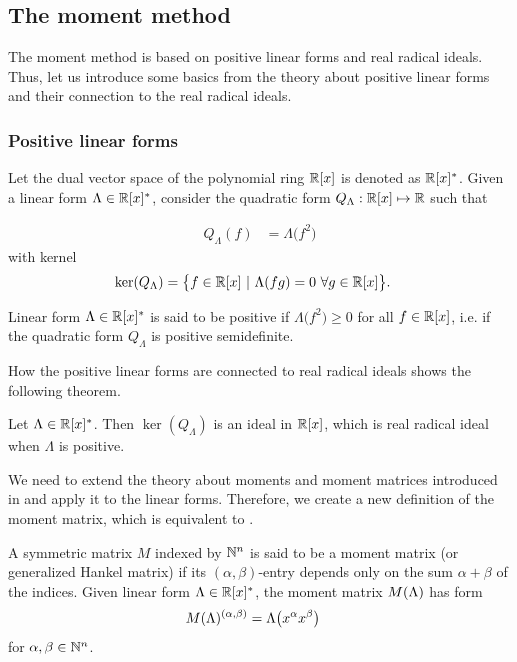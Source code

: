 \subsection{The moment method}
The moment method is based on positive linear forms and real radical ideals.
Thus, let us introduce some basics from the theory about positive linear forms and their connection to the real radical ideals.

\subsubsection{Positive linear forms}
Let the dual vector space of the polynomial ring $\mathbb{R}[x]$ is denoted as $\mathbb{R}[x]^*$.
Given a linear form $\Lambda\in\mathbb{R}[x]^*$, consider the quadratic form $Q_\Lambda : \mathbb{R}[x]\mapsto\mathbb{R}$ such that

\begin{align}
  Q_\Lambda(f) &= \Lambda\big(f^2\big)
\end{align}
with kernel
\begin{align}
  \operatorname{ker}(Q_\Lambda) &= \big\{f\in\mathbb{R}[x]\ |\ \Lambda(fg)=0\ \forall g\in\mathbb{R}[x]\big\}.
\end{align}

\begin{definition}[Positivity]
  Linear form $\Lambda\in\mathbb{R}[x]^*$ is said to be positive if $\Lambda\big(f^2\big) \geq 0$ for all $f\in\mathbb{R}[x]$, i.e. if the quadratic form $Q_\Lambda$ is positive semidefinite.
\end{definition}

How the positive linear forms are connected to real radical ideals shows the following theorem.

\begin{theorem}
  Let $\Lambda\in\mathbb{R}[x]^*$. Then $\ker(Q_\Lambda)$ is an ideal in $\mathbb{R}[x]$, which is real radical ideal when $\Lambda$ is positive.
\end{theorem}

We need to extend the theory about moments and moment matrices introduced in  and apply it to the linear forms.
Therefore, we create a new definition of the moment matrix, which is equivalent to .

\begin{definition}
  A symmetric matrix $M$ indexed by $\mathbb{N}^n$ is said to be a moment matrix (or generalized Hankel matrix) if its $(\alpha, \beta)$-entry depends only on the sum $\alpha + \beta$ of the indices.
  Given linear form $\Lambda\in\mathbb{R}[x]^*$, the moment matrix $M(\Lambda)$ has form
  \begin{align}
    M(\Lambda)^{(\alpha, \beta)} &= \Lambda\big(x^\alpha x^\beta\big)
  \end{align}
  for $\alpha, \beta \in\mathbb{N}^n$.
\end{definition}

